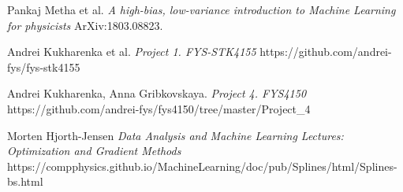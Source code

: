 \documentclass[10pt]{article}
\begin{document}
\newpage
\begin{thebibliography}{9}
	Pankaj Metha et al. 
	\textit{A high-bias, low-variance introduction to Machine Learning for physicists}
	ArXiv:1803.08823.
	
	Andrei Kukharenka et al.
	\textit{Project 1. FYS-STK4155 }
	https://github.com/andrei-fys/fys-stk4155
	
	Andrei Kukharenka, Anna Gribkovskaya.
	\textit{Project 4. FYS4150 }
	https://github.com/andrei-fys/fys4150/tree/master/Project_4
	
	Morten Hjorth-Jensen 
	\textit{Data Analysis and Machine Learning Lectures: Optimization and Gradient Methods}
	https://compphysics.github.io/MachineLearning/doc/pub/Splines/html/Splines-bs.html
	
\end{thebibliography}
\end{document}

